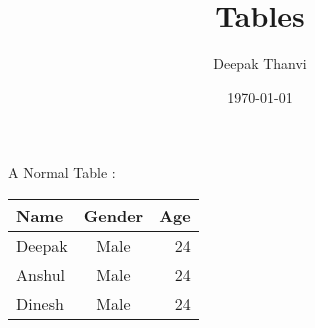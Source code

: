 \documentclass{article}
\title{Tables}
\author{Deepak Thanvi}
\date{\today}
\begin{document}
\maketitle

A Normal Table :


\begin{tabular}{|l|c|r|} %

	\toprule
	Name & Gender & Age\\ %
	\midrule
	Deepak & Male & 24\\
	Anshul & Male & 24\\
	Dinesh & Male & 24\\
	\bottomrule

\end{tabular}
\end{document}
